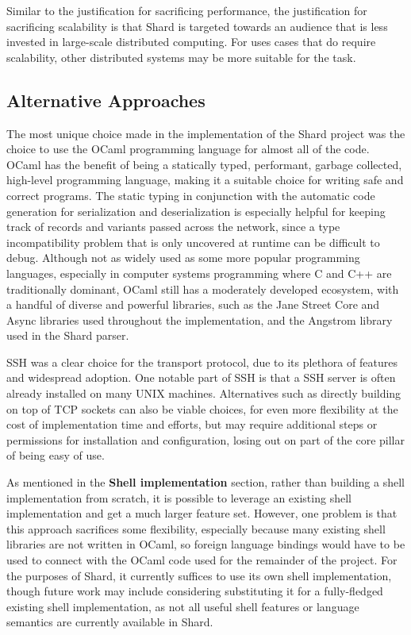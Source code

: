 \documentclass[oneside]{report}
\begin{document}
Similar to the justification for sacrificing performance, the justification for sacrificing scalability is that Shard is targeted towards an audience that is less invested in large-scale distributed computing.
For uses cases that do require scalability, other distributed systems may be more suitable for the task.

\subsection{Alternative Approaches}

The most unique choice made in the implementation of the Shard project was the choice to use the OCaml programming language for almost all of the code.
OCaml has the benefit of being a statically typed, performant, garbage collected, high-level programming language, making it a suitable choice for writing safe and correct programs.
The static typing in conjunction with the automatic code generation for serialization and deserialization is especially helpful for keeping track of records and variants passed across the network, since a type incompatibility problem that is only uncovered at runtime can be difficult to debug.
Although not as widely used as some more popular programming languages, especially in computer systems programming where C and C++ are traditionally dominant, OCaml still has a moderately developed ecosystem, with a handful of diverse and powerful libraries, such as the Jane Street Core and Async libraries used throughout the implementation, and the Angstrom library used in the Shard parser.

SSH was a clear choice for the transport protocol, due to its plethora of features and widespread adoption.
One notable part of SSH is that a SSH server is often already installed on many UNIX machines.
Alternatives such as directly building on top of TCP sockets can also be viable choices, for even more flexibility at the cost of implementation time and efforts, but may require additional steps or permissions for installation and configuration, losing out on part of the core pillar of being easy of use.

As mentioned in the \textbf{Shell implementation} section, rather than building a shell implementation from scratch, it is possible to leverage an existing shell implementation and get a much larger feature set.
However, one problem is that this approach sacrifices some flexibility, especially because many existing shell libraries are not written in OCaml, so foreign language bindings would have to be used to connect with the OCaml code used for the remainder of the project.
For the purposes of Shard, it currently suffices to use its own shell implementation, though future work may include considering substituting it for a fully-fledged existing shell implementation, as not all useful shell features or language semantics are currently available in Shard.
\end{document}
